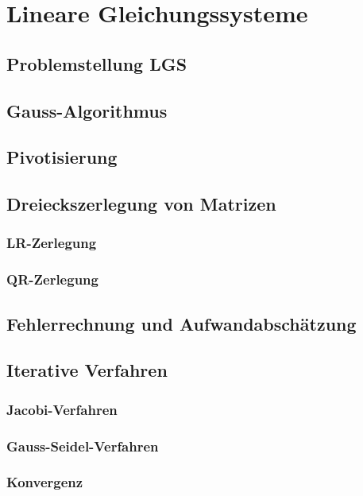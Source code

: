 \section{Lineare Gleichungssysteme}

\subsection{Problemstellung LGS}

\subsection{Gauss-Algorithmus}

\subsection{Pivotisierung}

\subsection{Dreieckszerlegung von Matrizen}
\subsubsection{LR-Zerlegung}
\subsubsection{QR-Zerlegung}

\subsection{Fehlerrechnung und Aufwandabschätzung}

\subsection{Iterative Verfahren}
\subsubsection{Jacobi-Verfahren}
\subsubsection{Gauss-Seidel-Verfahren}
\subsubsection{Konvergenz}
